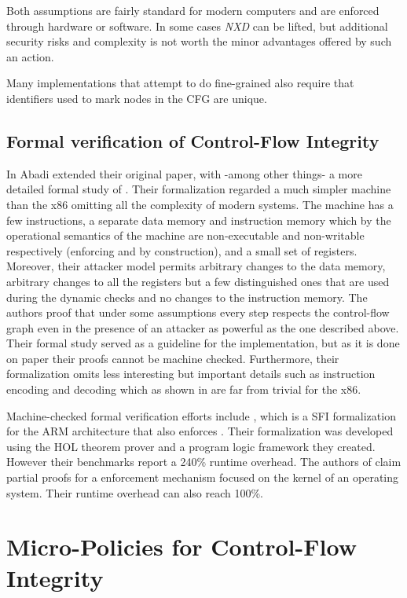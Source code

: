 Both assumptions are fairly standard for modern computers and are enforced
through hardware or software. In some cases \emph{NXD} can be lifted, but
additional security risks and complexity is not worth the minor advantages
offered by such an action.

Many implementations that attempt to do fine-grained \CFI also require that
identifiers used to mark nodes in the CFG are unique.

\subsection{Formal verification of Control-Flow Integrity}\label{sec:cfi_verif}

In \cite{AbadiBEL09} Abadi \ETAL extended their original paper, with
-among other things- a more detailed formal study of \CFI. Their
formalization regarded a much simpler machine than the x86 omitting
all the complexity of modern systems. The machine has a few
instructions, a separate data memory and instruction memory which by
the operational semantics of the machine are non-executable and
non-writable respectively (enforcing \NXD and \NWC by construction),
and a small set of registers. Moreover, their attacker model permits
arbitrary changes to the data memory, arbitrary changes to all the
registers but a few distinguished ones that are used during the
dynamic checks and no changes to the instruction memory.  The authors
proof that under some assumptions every step respects the control-flow
graph even in the presence of an attacker as powerful as the one
described above. Their formal study served as a guideline for the
implementation, but as it is done on paper their proofs cannot be
machine checked. Furthermore, their formalization omits less
interesting but important details such as instruction encoding and
decoding which as shown in \cite{MorrisettTTTG12} are far from trivial
for the x86.

Machine-checked formal verification efforts include \cite{ZhaoLSR11},
which is a SFI formalization for the ARM architecture that also
enforces \CFI. Their formalization was developed using the HOL
theorem prover and a program logic framework they created. However
their benchmarks report a 240\% runtime overhead. The authors of
\cite{CriswellDA14} claim partial proofs for a \CFI enforcement
mechanism focused on the kernel of an operating system. Their runtime
overhead can also reach 100\%.

\section{Micro-Policies for Control-Flow Integrity}
\label{sec:cfi_policies}

